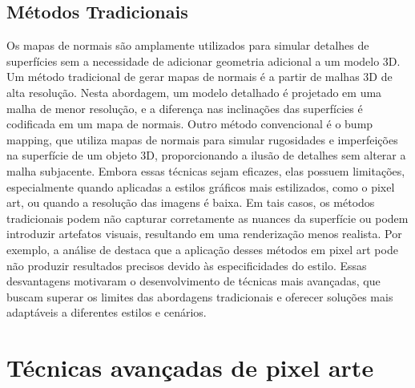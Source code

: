 \subsection{Métodos Tradicionais}

Os mapas de normais são amplamente utilizados para simular detalhes de superfícies sem a necessidade de adicionar geometria adicional a um modelo 3D.
Um método tradicional de gerar mapas de normais é a partir de malhas 3D de alta resolução. 
Nesta abordagem, um modelo detalhado é projetado em uma malha de menor resolução, e a diferença nas inclinações das superfícies é codificada em um mapa de normais.
Outro método convencional é o bump mapping, que utiliza mapas de normais para simular rugosidades e imperfeições na superfície de um objeto 3D, proporcionando a ilusão de detalhes sem alterar a malha subjacente. 
Embora essas técnicas sejam eficazes, elas possuem limitações, especialmente quando aplicadas a estilos gráficos mais estilizados, como o pixel art, ou quando a resolução das imagens é baixa. 
Em tais casos, os métodos tradicionais podem não capturar corretamente as nuances da superfície ou podem introduzir artefatos visuais, resultando em uma renderização menos realista. 
Por exemplo, a análise de \cite{Moreira} destaca que a aplicação desses métodos em pixel art pode não produzir resultados precisos devido às especificidades do estilo.
Essas desvantagens motivaram o desenvolvimento de técnicas mais avançadas, que buscam superar os limites das abordagens tradicionais e oferecer soluções mais adaptáveis a diferentes estilos e cenários.

\section{Técnicas avançadas de pixel arte}

